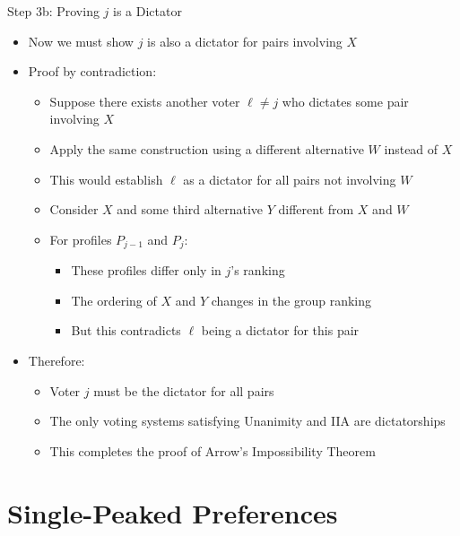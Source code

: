 \documentclass[10pt,handout]{beamer}
\begin{document}
\begin{frame}{Step 3b: Proving $j$ is a Dictator}
  \begin{itemize}[<+->]
    \item Now we must show $j$ is also a dictator for pairs involving $X$
    \item Proof by contradiction:
      \begin{itemize}
        \item Suppose there exists another voter $\ell \neq j$ who dictates some pair involving $X$
        \item Apply the same construction using a different alternative $W$ instead of $X$
        \item This would establish $\ell$ as a dictator for all pairs not involving $W$
        \item Consider $X$ and some third alternative $Y$ different from $X$ and $W$
        \item For profiles $P_{j-1}$ and $P_j$:
          \begin{itemize}
            \item These profiles differ only in $j$'s ranking
            \item The ordering of $X$ and $Y$ changes in the group ranking
            \item But this contradicts $\ell$ being a dictator for this pair
          \end{itemize}
      \end{itemize}
    \item Therefore:
      \begin{itemize}
        \item Voter $j$ must be the dictator for all pairs
        \item The only voting systems satisfying Unanimity and IIA are dictatorships
        \item This completes the proof of Arrow's Impossibility Theorem
      \end{itemize}
  \end{itemize}
\end{frame}

\section{Single-Peaked Preferences}
\end{document}
